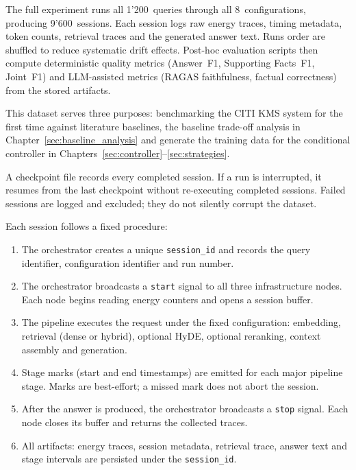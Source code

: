 
The full experiment runs all 1{'}200~queries through all
8~configurations, producing 9{'}600~sessions. Each session logs raw energy
traces, timing metadata, token counts, retrieval traces and the generated
answer text. Runs order are shuffled to reduce systematic drift effects.
Post-hoc evaluation scripts then compute deterministic quality
metrics (Answer~F1, Supporting Facts~F1, Joint~F1) and LLM-assisted metrics
(RAGAS faithfulness, factual correctness) from the stored artifacts.

This dataset serves three purposes: benchmarking the CITI KMS system for
the first time against literature baselines, the baseline trade-off analysis
in Chapter~\ref{sec:baseline_analysis} and generate the training data for the
conditional controller in Chapters~\ref{sec:controller}--\ref{sec:strategies}.


A checkpoint file records every completed session. If a run is interrupted, it
resumes from the last checkpoint without re-executing completed sessions. Failed
sessions are logged and excluded; they do not silently corrupt the dataset.


Each session follows a fixed procedure:

\begin{enumerate}
    \item The orchestrator creates a unique \texttt{session\_id} and records the
          query identifier, configuration identifier and run number.
    \item The orchestrator broadcasts a \texttt{start} signal to all three
          infrastructure nodes. Each node begins reading energy counters and
          opens a session buffer.
    \item The pipeline executes the request under the fixed configuration:
          embedding, retrieval (dense or hybrid), optional HyDE, optional
          reranking, context assembly and generation.
    \item Stage marks (start and end timestamps) are emitted for each major
          pipeline stage. Marks are best-effort; a missed mark does not abort
          the session.
    \item After the answer is produced, the orchestrator broadcasts a
          \texttt{stop} signal. Each node closes its buffer and returns the
          collected traces.
    \item All artifacts: energy traces, session metadata, retrieval trace,
          answer text and stage intervals are persisted under the \texttt{session\_id}.
\end{enumerate}


